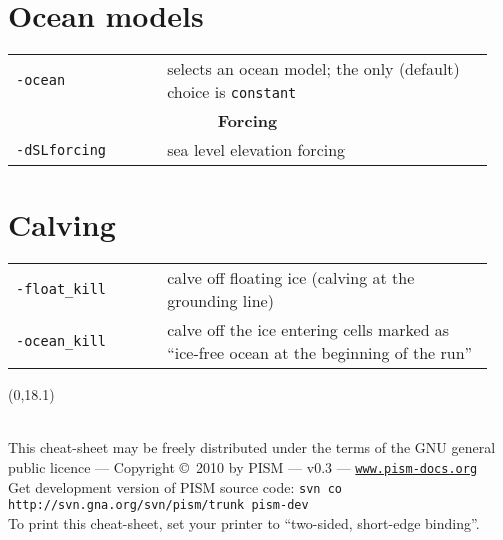 \documentclass[landscape]{article}
\newcommand{\PISMDOWNLOADMSG}{Get development version of PISM source code: \texttt{svn co http://svn.gna.org/svn/pism/trunk pism-dev}}
\newcommand{\tabletitle}[1]{\multicolumn{2}{c}{\textbf{#1}}}
\begin{document}
\begin{textblock}{15}
\section{Ocean models}
\label{sec:ocean-models}

\begin{tabular}{@{}p{0.3\linewidth}p{0.65\linewidth}@{}}
\texttt{-ocean} & selects an ocean model; the only (default) choice is
\texttt{constant} \\
\tabletitle{Forcing} \\
\texttt{-dSLforcing} & sea level elevation forcing\\
\end{tabular}

\section{Calving}
\label{sec:calving}
\begin{tabular}{@{}p{0.3\linewidth}p{0.65\linewidth}@{}}
  \texttt{-float_kill} & calve off floating ice (calving at the grounding
  line)\\
\texttt{-ocean_kill} & calve off the ice entering cells marked as ``ice-free
ocean at the beginning of the run''
\end{tabular}

\end{textblock}

\null\newpage
\begin{textblock}{47}(0,18.1)
  \begin{center}
    \hrulefill\\
    This cheat-sheet may be freely distributed under the terms of the GNU general
    public licence --- Copyright \copyright\ 2010 by PISM --- v0.3 ---
    \href{http://www.pism-docs.org}{\texttt{www.pism-docs.org}}\\
    \PISMDOWNLOADMSG\\
    To print this cheat-sheet, set your printer to ``two-sided, short-edge binding''.
 \end{center}
\end{textblock}
\end{document}
